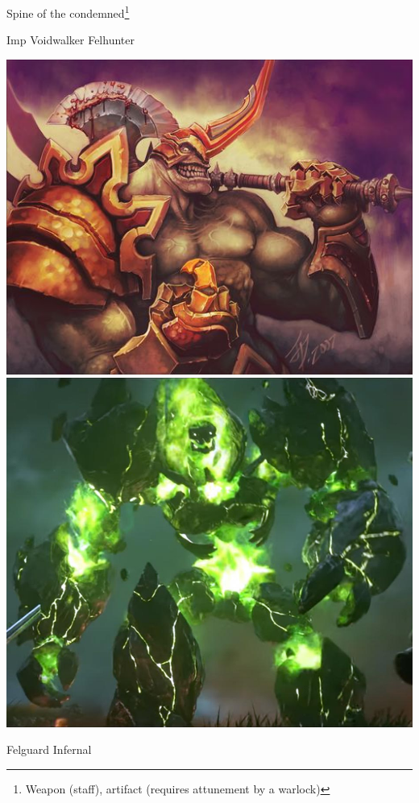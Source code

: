 \begin{commentbox}{Spine of the condemned\footnote{Weapon (staff), artifact (requires attunement by a warlock)}}
\begin{center}
		Imp \hspace{4cm} Voidwalker \hspace{3.5cm} Felhunter
	\end{center}
	\begin{center}
		\includegraphics[width=0.52\linewidth]{img/WoW/516px-Felguard-art.jpg}
		\includegraphics[width=0.47\linewidth]{img/WoW/Warcraft-III-Reforged-Cinematic-Trailer.jpg}
		
		Felguard \hspace{7.5cm} Infernal
	\end{center}
\end{commentbox}

